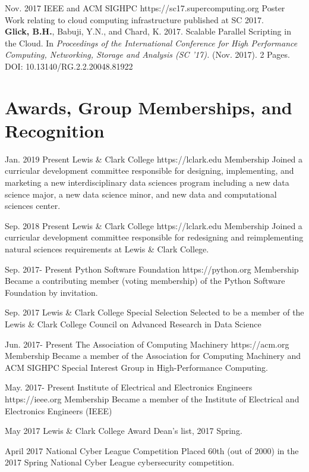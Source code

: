 \documentclass[10pt]{article} %
\begin{document}
\award
{Nov. 2017}
{ }
{IEEE and ACM SIGHPC}
{https://sc17.supercomputing.org}
{Poster}
{Work relating to cloud computing infrastructure published at SC 2017. \\ \textbf{Glick, B.H.}, Babuji, Y.N., and Chard, K. 2017. Scalable Parallel Scripting in the Cloud. In \textit{Proceedings of the International Conference for High Performance Computing, Networking, Storage and Analysis (SC '17).} (Nov. 2017). 2 Pages. DOI: 10.13140/RG.2.2.20048.81922}

\section{Awards, Group Memberships, and Recognition}

\award
{Jan. 2019}
{Present}
{Lewis \& Clark College}
{https://lclark.edu}
{Membership}
{Joined a curricular development committee responsible for designing, implementing, and marketing a new interdisciplinary data sciences program including a new data science major, a new data science minor, and new data and computational sciences center.}

\award
{Sep. 2018}
{Present}
{Lewis \& Clark College}
{https://lclark.edu}
{Membership}
{Joined a curricular development committee responsible for redesigning and reimplementing natural sciences requirements at Lewis \& Clark College.}

\award
{Sep. 2017-}
{Present}
{Python Software Foundation}
{https://python.org}
{Membership}
{Became a contributing member (voting membership) of the Python Software Foundation by invitation.}

\award
{Sep. 2017}
{ }
{Lewis \& Clark College}
{ }
{Special Selection}
{Selected to be a member of the Lewis \& Clark College Council on Advanced Research in Data Science}

\award
{Jun. 2017-}
{Present}
{The Association of Computing Machinery}
{https://acm.org}
{Membership}
{Became a member of the Association for Computing Machinery and ACM SIGHPC Special Interest Group in High-Performance Computing.}

\award
{May. 2017-}
{Present}
{Institute of Electrical and Electronics Engineers}
{https://ieee.org}
{Membership}
{Became a member of the Institute of Electrical and Electronics Engineers (IEEE)}

\award
{May 2017}
{ }
{Lewis \& Clark College}
{}
{Award}
{Dean's list, 2017 Spring.}

\award
{April 2017}
{ }
{National Cyber League}
{}
{Competition}
{Placed 60th (out of 2000) in the 2017 Spring National Cyber League cybersecurity competition.}
\end{document}
